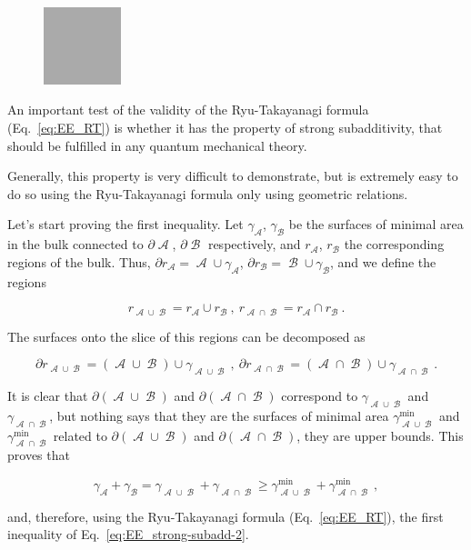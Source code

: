 \documentclass[twocolumn]{revtex4}
\providecommand{\eq}[2]{
    \begin{equation}
        #2
    \label{eq:#1}
    \end{equation}
}
\DeclareMathOperator{\calA}{\mathcal{A}}
\DeclareMathOperator{\calB}{\mathcal{B}}
\begin{document}
\begin{figure}
    \centering
    \includegraphics[width=0.2\textwidth]{../Imatges/empty.png}
\label{fig:}
\caption{}
\end{figure}

An important test of the validity of the Ryu-Takayanagi formula (Eq.~\ref{eq:EE_RT}) is whether it has the property of strong subadditivity, that should be fulfilled in any quantum mechanical theory.

Generally, this property is very difficult to demonstrate, but is extremely easy to do so using the Ryu-Takayanagi formula only using geometric relations.

Let's start proving the first inequality. Let $\gamma_{\calA}$, $\gamma_{\calB}$ be the surfaces of minimal area in the bulk connected to $\partial \calA$, $\partial \calB$ respectively, and $r_{\calA}$, $r_{\calB}$ the corresponding regions of the bulk. Thus, $\partial r_{\calA} = \calA \cup \gamma_{\calA}$, $\partial r_{\calB} = \calB \cup \gamma_{\calB}$, and we define the regions
\eq{SS_r-1}{
    r_{\calA \cup \calB} = r_{\calA} \cup r_{\calB} \ , \ r_{\calA \cap \calB} = r_{\calA} \cap r_{\calB} \ .
}
The surfaces onto the slice of this regions can be decomposed as
\eq{SS_dr-1}{
    \partial r_{\calA \cup \calB} = (\calA \cup \calB) \cup \gamma_{\calA \cup \calB} \ , \ \partial r_{\calA \cap \calB } = (\calA \cap \calB) \cup \gamma_{\calA \cap \calB} \ .
    }
It is clear that $\partial (\calA \cup \calB)$ and $\partial (\calA \cap \calB)$ correspond to $\gamma_{\calA \cup \calB}$ and $\gamma_{\calA \cap \calB}$, but nothing says that they are the surfaces of minimal area $\gamma^{\text{min}}_{\calA \cup \calB}$ and $\gamma^{\text{min}}_{\calA \cap \calB}$ related to $\partial (\calA \cup \calB)$ and $\partial (\calA \cap \calB)$, they are upper bounds. This proves that
\eq{SS_gamma-1}{
    \gamma_{\calA} + \gamma_{\calB} = \gamma_{\calA \cup \calB} + \gamma_{\calA \cap \calB} \ge \gamma^{\text{min}}_{\calA \cup \calB} + \gamma^{\text{min}}_{\calA \cap \calB} \ ,
}
and, therefore, using the Ryu-Takayanagi formula (Eq.~\ref{eq:EE_RT}), the first inequality of Eq.~\ref{eq:EE_strong-subadd-2}.
\end{document}
